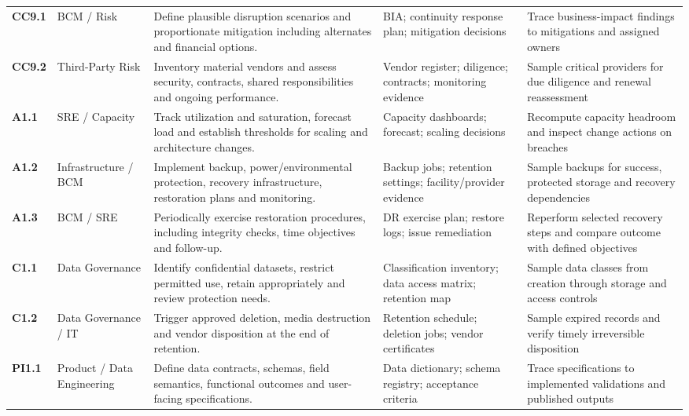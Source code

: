 \documentclass[10pt,oneside]{report}
\begin{document}
\begin{landscape}
\begin{longtable}{@{}>{\raggedright\arraybackslash}p{0.6in}>{\raggedright\arraybackslash}p{1.0in}>{\raggedright\arraybackslash}p{2.5in}>{\raggedright\arraybackslash}p{2.35in}>{\raggedright\arraybackslash}p{2.20in}@{}}
\addlinespace[5pt]
\textbf{CC9.1} & BCM / Risk & Define plausible disruption scenarios and proportionate mitigation including alternates and financial options. & BIA; continuity response plan; mitigation decisions & Trace business-impact findings to mitigations and assigned owners \\
\addlinespace[5pt]
\textbf{CC9.2} & Third-Party Risk & Inventory material vendors and assess security, contracts, shared responsibilities and ongoing performance. & Vendor register; diligence; contracts; monitoring evidence & Sample critical providers for due diligence and renewal reassessment \\
\addlinespace[5pt]
\textbf{A1.1} & SRE / Capacity & Track utilization and saturation, forecast load and establish thresholds for scaling and architecture changes. & Capacity dashboards; forecast; scaling decisions & Recompute capacity headroom and inspect change actions on breaches \\
\addlinespace[5pt]
\textbf{A1.2} & Infrastructure / BCM & Implement backup, power/environmental protection, recovery infrastructure, restoration plans and monitoring. & Backup jobs; retention settings; facility/provider evidence & Sample backups for success, protected storage and recovery dependencies \\
\addlinespace[5pt]
\textbf{A1.3} & BCM / SRE & Periodically exercise restoration procedures, including integrity checks, time objectives and follow-up. & DR exercise plan; restore logs; issue remediation & Reperform selected recovery steps and compare outcome with defined objectives \\
\addlinespace[5pt]
\textbf{C1.1} & Data Governance & Identify confidential datasets, restrict permitted use, retain appropriately and review protection needs. & Classification inventory; data access matrix; retention map & Sample data classes from creation through storage and access controls \\
\addlinespace[5pt]
\textbf{C1.2} & Data Governance / IT & Trigger approved deletion, media destruction and vendor disposition at the end of retention. & Retention schedule; deletion jobs; vendor certificates & Sample expired records and verify timely irreversible disposition \\
\addlinespace[5pt]
\textbf{PI1.1} & Product / Data Engineering & Define data contracts, schemas, field semantics, functional outcomes and user-facing specifications. & Data dictionary; schema registry; acceptance criteria & Trace specifications to implemented validations and published outputs \\

\end{longtable}
\end{landscape}
\end{document}
